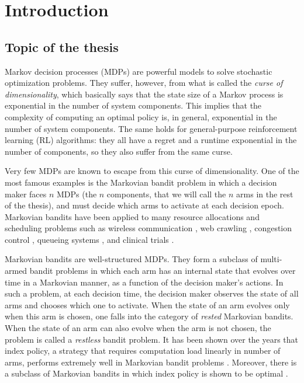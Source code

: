 \begingroup
\let\clearpage\relax

\chapter{Introduction}
\label{chapter:introduction}

\section{Topic of the thesis}

Markov decision processes (MDPs) are powerful models to solve stochastic optimization problems. They suffer, however, from what is called the \emph{curse of dimensionality}, which basically says that the state size of a Markov process is exponential in the number of system components. This implies that the complexity of computing an optimal policy is, in general, exponential in the number of system components. The same holds for general-purpose reinforcement learning (RL) algorithms: they all have a regret and a runtime exponential in the number of components, so they also suffer from the same curse.

Very few MDPs are known to escape from this curse of dimensionality. One of the most famous examples is the Markovian bandit problem in which a decision maker faces $n$ MDPs (the $n$ components, that we will call the $n$ arms in the rest of the thesis), and must decide which arms to activate at each decision epoch.
Markovian bandits have been applied to many resource allocations and scheduling problems such as wireless communication \cite{raghunathan2008index, liu2010indexability, aalto2019whittle}, web crawling \cite{nino2014dynamic, avrachenkov2022whittle}, congestion control \cite{avrachenkov2013congestion, avrachenkov2018impulsive}, queueing systems \cite{glazebrook2009index, aalto2009gittins, archibald2009indexability, aalto2011properties, larranaga2015asymptotically, borkar2017whittle, scully2018soap}, and clinical trials \cite{villar2015multi}.

Markovian bandits are well-structured MDPs.
They form a subclass of multi-armed bandit problems in which each arm has an internal state that evolves over time in a Markovian manner, as a function of the decision maker’s actions.
In such a problem, at each decision time, the decision maker observes the state of all arms and chooses which one to activate.
When the state of an arm evolves only when this arm is chosen, one falls into the category of \emph{rested} Markovian bandits.
When the state of an arm can also evolve when the arm is not chosen, the problem is called a \emph{restless} bandit problem.
It has been shown over the years that index policy, a strategy that requires computation load linearly in number of arms, performs extremely well in Markovian bandit problems \cite{glazebrook2002index, ansell2003whittle, glazebrook2006some, avrachenkov2013congestion, akbarzadeh2019restless}.
Moreover, there is a subclass of Markovian bandits in which index policy is shown to be optimal \cite{gittins1979bandit}.

